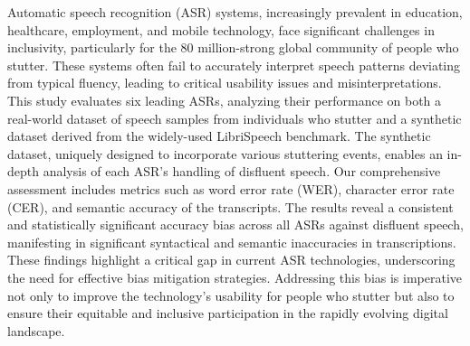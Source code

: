 Automatic speech recognition (ASR) systems, increasingly prevalent in education, healthcare, employment, and mobile technology, face significant challenges in inclusivity, particularly for the 80 million-strong global community of people who stutter. These systems often fail to accurately interpret speech patterns deviating from typical fluency, leading to critical usability issues and misinterpretations. This study evaluates six leading ASRs, analyzing their performance on both a real-world dataset of speech samples from individuals who stutter and a synthetic dataset derived from the widely-used LibriSpeech benchmark. The synthetic dataset, uniquely designed to incorporate various stuttering events, enables an in-depth analysis of each ASR's handling of disfluent speech. Our comprehensive assessment includes metrics such as word error rate (WER), character error rate (CER), and semantic accuracy of the transcripts. The results reveal a consistent and statistically significant accuracy bias across all ASRs against disfluent speech, manifesting in significant syntactical and semantic inaccuracies in transcriptions. These findings highlight a critical gap in current ASR technologies, underscoring the need for effective bias mitigation strategies. Addressing this bias is imperative not only to improve the technology's usability for people who stutter but also to ensure their equitable and inclusive participation in the rapidly evolving digital landscape.